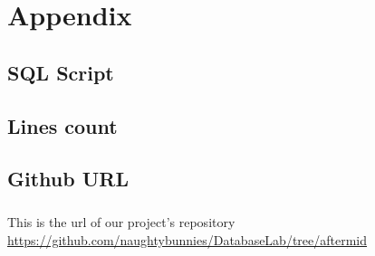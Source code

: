 
\chapter{Appendix}
  \section{SQL Script}
    \ttfamily
    
    \rmfamily
  \section{Lines count}
    \ttfamily
    
    \rmfamily
  \section{Github URL}
    \paragraph{}
      This is the url of our project's repository
      \url{https://github.com/naughtybunnies/DatabaseLab/tree/aftermid}


